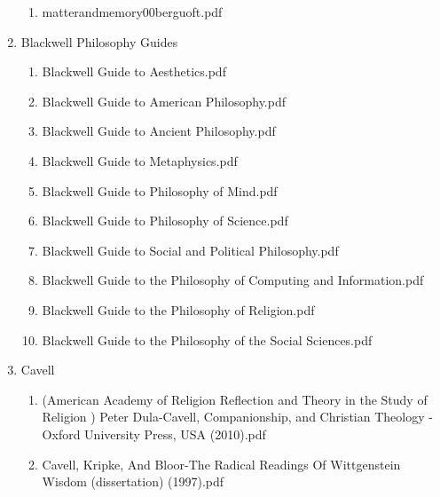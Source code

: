 \documentclass[11pt]{article}
\begin{document}
\begin{enumerate}
\begin{enumerate}
\item matterandmemory00berguoft.pdf
\label{sec-1-1-1-1-34-30-7}
\end{enumerate}

\item Blackwell Philosophy Guides
\label{sec-1-1-1-1-34-31}
\begin{enumerate}
\item Blackwell Guide to Aesthetics.pdf
\label{sec-1-1-1-1-34-31-1}

\item Blackwell Guide to American Philosophy.pdf
\label{sec-1-1-1-1-34-31-2}

\item Blackwell Guide to Ancient Philosophy.pdf
\label{sec-1-1-1-1-34-31-3}

\item Blackwell Guide to Metaphysics.pdf
\label{sec-1-1-1-1-34-31-4}

\item Blackwell Guide to Philosophy of Mind.pdf
\label{sec-1-1-1-1-34-31-5}

\item Blackwell Guide to Philosophy of Science.pdf
\label{sec-1-1-1-1-34-31-6}

\item Blackwell Guide to Social and Political Philosophy.pdf
\label{sec-1-1-1-1-34-31-7}

\item Blackwell Guide to the Philosophy of Computing and Information.pdf
\label{sec-1-1-1-1-34-31-8}

\item Blackwell Guide to the Philosophy of Religion.pdf
\label{sec-1-1-1-1-34-31-9}

\item Blackwell Guide to the Philosophy of the Social Sciences.pdf
\label{sec-1-1-1-1-34-31-10}
\end{enumerate}

\item Cavell
\label{sec-1-1-1-1-34-32}
\begin{enumerate}
\item (American Academy of Religion Reflection and Theory in the Study of Religion ) Peter Dula-Cavell, Companionship, and Christian Theology  -Oxford University Press, USA (2010).pdf
\label{sec-1-1-1-1-34-32-1}

\item Cavell, Kripke, And Bloor-The Radical Readings Of Wittgenstein Wisdom (dissertation) (1997).pdf
\label{sec-1-1-1-1-34-32-2}


\end{enumerate}
\end{enumerate}
\end{document}
